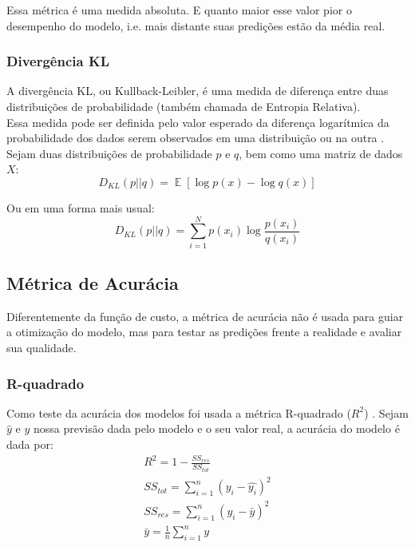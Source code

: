 Essa métrica é uma medida absoluta. E quanto maior esse valor pior o desempenho
do modelo, i.e. mais distante suas predições estão da média real. \\

\subsubsection{Divergência KL}

A divergência KL, ou Kullback-Leibler, é uma medida de diferença entre duas distribuições de probabilidade (também chamada de Entropia Relativa). \\
Essa medida pode ser definida pelo valor esperado da diferença logarítmica da probabilidade dos dados serem observados em uma distribuição ou na outra \citep{dlbook}. \\
Sejam duas distribuições de probabilidade $p$ e $q$, bem como uma matriz de dados $X$: \\

\[D_{KL}(p || q) = \mathop{\mathbb{E}}[\log p(x) - \log q(x)]​\]

Ou em uma forma mais usual: \\

\[D_{KL}(p||q) = \sum_{i=1}^{N}p(x_{i}) \log \frac{p(x_{i})}{q(x_{i})}​\]



\subsection{Métrica de Acurácia}

Diferentemente da função de custo, a métrica de acurácia não é usada para guiar a otimização do modelo,
mas para testar as predições frente a realidade e avaliar sua qualidade. \\

\subsubsection{R-quadrado}
Como teste da acurácia dos modelos foi usada a métrica R-quadrado ($R^2$) \citep{cohen}. Sejam $\hat{y}$ e $y$ nossa previsão dada pelo modelo e o seu valor real, a acurácia do modelo é dada por:\\

\begin{align}
&R^2 = 1 - \frac{SS_{res}}{SS_{tot}} &\\
&SS_{tot} = \sum^n_{i=1} (y_i- \hat{y_i})^2 &\\
&SS_{res} = \sum^n_{i=1} (y_i - \bar{y})^2 &\\
&\bar{y} = \frac{1}{n} \sum^n_{i=1} y &
\end{align}


